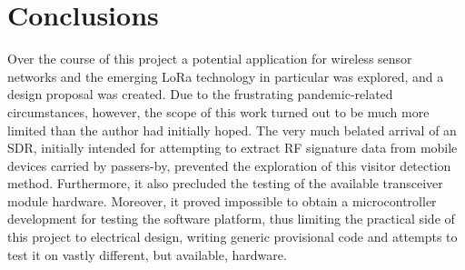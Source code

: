 \documentclass[10pt,nocopyrightspace]{ewsn-proc}
\begin{document}
\section{Conclusions}
Over the course of this project a potential application for wireless sensor networks and the emerging LoRa technology in particular was explored, and a design proposal was created. Due to the frustrating pandemic-related circumstances, however, the scope of this work turned out to be much more limited than the author had initially hoped. The very much belated arrival of an SDR, initially intended for attempting to extract RF signature data from mobile devices carried by passers-by, prevented the exploration of this visitor detection method. Furthermore, it also precluded the testing of the available transceiver module hardware. Moreover, it proved impossible to obtain a microcontroller development for testing the software platform, thus limiting the practical side of this project to electrical design, writing generic provisional code and attempts to test it on vastly different, but available, hardware.


\newpage

%
%

%
%
\balance

\end{document}
